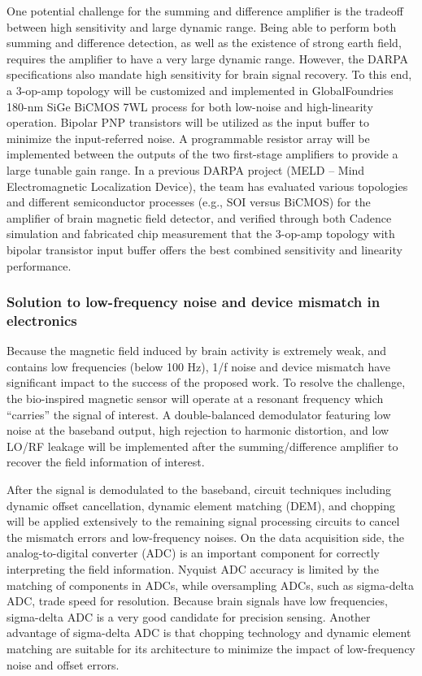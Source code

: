 One potential challenge for the summing and difference amplifier is the tradeoff between high sensitivity and large dynamic range. Being able to perform both summing and difference detection, as well as the existence of strong earth field, requires the amplifier to have a very large dynamic range. However, the DARPA specifications also mandate high sensitivity for brain signal recovery. To this end, a 3-op-amp topology will be customized and implemented in GlobalFoundries 180-nm SiGe BiCMOS 7WL process for both low-noise and high-linearity operation. Bipolar PNP transistors will be utilized as the input buffer to minimize the input-referred noise. A programmable resistor array will be implemented between the outputs of the two first-stage amplifiers to provide a large tunable gain range. In a previous DARPA project (MELD – Mind Electromagnetic Localization Device), the team has evaluated various topologies and different semiconductor processes (e.g., SOI versus BiCMOS) for the amplifier of brain magnetic field detector, and verified through both Cadence simulation and fabricated chip measurement that the 3-op-amp topology with bipolar transistor input buffer offers the best combined sensitivity and linearity performance.

\subsubsection{Solution to low-frequency noise and device mismatch in electronics}

Because the magnetic field induced by brain activity is extremely weak, and contains low frequencies (below 100 Hz), 1/f noise and device mismatch have significant impact to the success of the proposed work. To resolve the challenge, the bio-inspired magnetic sensor will operate at a resonant frequency which “carries” the signal of interest. A double-balanced demodulator featuring low noise at the baseband output, high rejection to harmonic distortion, and low LO/RF leakage will be implemented after the summing/difference amplifier to recover the field information of interest. 

After the signal is demodulated to the baseband, circuit techniques including dynamic offset cancellation, dynamic element matching (DEM), and chopping will be applied extensively to the remaining signal processing circuits to cancel the mismatch errors and low-frequency noises. On the data acquisition side, the analog-to-digital converter (ADC) is an important component for correctly interpreting the field information. Nyquist ADC accuracy is limited by the matching of components in ADCs, while oversampling ADCs, such as sigma-delta ADC, trade speed for resolution. Because brain signals have low frequencies, sigma-delta ADC is a very good candidate for precision sensing. Another advantage of sigma-delta ADC is that chopping technology and dynamic element matching are suitable for its architecture to minimize the impact of low-frequency noise and offset errors.


